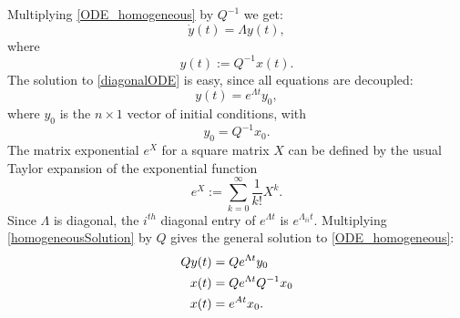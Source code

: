 \documentclass[../../lecture_notes.tex]{subfiles}
\begin{document}
Multiplying \eqref{ODE_homogeneous} by \(Q^{-1}\) we get:
\begin{equation}
  \dot{y}(t)=\Lambda y(t),
  \label{diagonalODE}
\end{equation}
where
\begin{equation*}
  y(t):= Q^{-1}x(t).
\end{equation*}
The solution to \eqref{diagonalODE} is easy, since all equations are decoupled:
\begin{equation}
  y(t)=e^{\Lambda t}y_{0},
  \label{homogeneousSolution}
\end{equation}
where \(y_{0}\) is the \(n\times 1\) vector of initial conditions, with
\begin{equation*}
  y_{0}=Q^{-1}x_{0}.
\end{equation*}
The matrix exponential \(e^{X}\) for a square matrix \(X\) can be defined by the usual Taylor expansion of the exponential function
\begin{equation*}
  e^{X}:= \sum_{k=0}^{\infty}\frac{1}{k!}X^{k}.
\end{equation*}
Since \(\Lambda\) is diagonal, the \(i^{th}\) diagonal entry of \(e^{\Lambda t}\) is \(e^{\Lambda_{ii}t}\).
Multiplying \eqref{homogeneousSolution} by \(Q\) gives the general solution to \eqref{ODE_homogeneous}:
\begin{align}
  Qy(t) &=Qe^{\Lambda t}y_{0} \notag \\
  x(t) &=Qe^{\Lambda t}Q^{-1}x_{0} \notag \\
  x(t) &=e^{At}x_{0}.
  \label{x_homogeneousSolution}
\end{align}
\end{document}
